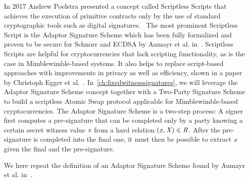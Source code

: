 In 2017 Andrew Poelstra presented a concept called Scriptless Scripts that achieves the execution of primitive contracts only by the use of standard cryptographic tools such as digital signatures.~\cite{poelstra2017scriptless}
The most prominent Scriptless Script is the Adaptor Signature Scheme which has been fully formalized and proven to be secure for Schnorr and ECDSA by Aumayr et al. in~\cite{aumayr2020bitcoinchannels}.
Scriptless Scripts are helpful for cryptocurrencies that lack scripting functionality, as is the case in Mimblewimble-based systems.
It also helps to replace script-based approaches with improvements in privacy as well as efficiency, shown in a paper by Christoph Egger et al.~\cite{egger2019atomic}.
In~\cref{ch:fixedwitnesssignatures}, we will leverage the Adaptor Signature Scheme concept together with a Two-Party Signature Scheme to build a scriptless Atomic Swap protocol applicable for Mimblewimble-based cryptocurrencies.
The Adaptor Signature Scheme is a two-step process:
A signer first computes a pre-signature that can be completed only by a party knowing a certain secret witness value $\mathit{x}$ from a hard relation $(\mathit{x}, \mathit{X}) \in \mathit{R}$.
After the pre-signature is completed into the final one, it must then be possible to extract $\mathit{x}$ given the final and the pre-signature.

We here repeat the definition of an Adaptor Signature Scheme found by Aumayr et al. in~\cite{aumayr2020bitcoinchannels}.

